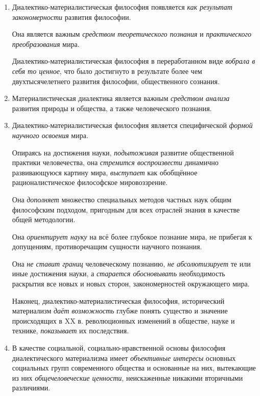 \documentclass[a4paper,14pt,russian]{extreport}
\begin{document}
\begin{enumerate}
\item Диалектико-материалистическая философия появляется \emph{как результат закономерности} развития философии.

Она является важным \emph{средством теоретического познания} и \emph{практического преобразования} мира.

Диалектико-материалистическая философия в переработанном виде \emph{вобрала в себя то ценное}, что было достигнуто в результате более чем двухтысячелетнего развития философии, общественного сознания.

\item Материалистическая диалектика является важным \emph{средством анализа} развития природы и общества, а также человеческого познания.

\item Диалектико-материалистическая философия является специфической \emph{формой научного освоения} мира.

Опираясь на достижения науки, \emph{подытоживая} развитие общественной практики человечества, она \emph{стремится воспроизвести} динамично развивающуюся картину мира, \emph{выступает} как обобщённое рационалистическое философское мировоззрение.

Она \emph{дополняет} множество специальных методов частных наук общим философским подходом, пригодным для всех отраслей знания в качестве общей методологии.

Она \emph{ориентирует науку} на всё более глубокое познание мира, не прибегая к допущениям, противоречащим сущности научного познания.

Она \emph{не ставит границ} человеческому познанию, \emph{не абсолютизирует} те или иные достижения науки, а \emph{старается обосновывать} необходимость раскрытия все новых и новых сторон, закономерностей окружающего мира.

Наконец, диалектико-материалистическая философия, исторический материализм \emph{даёт возможность} глубже понять существо и значение происходящих в XX в. революционных изменений в обществе, науке и технике, \emph{показывает} их последствия.

\item В качестве социальной, социально-нравственной основы философия диалектического материализма имеет \emph{объективные  интересы} основных социальных групп современного общества и   основанные на них, вытекающие из них \emph{общечеловеческие ценности}, неискаженные никакими вторичными различиями.


\end{enumerate}
\end{document}

